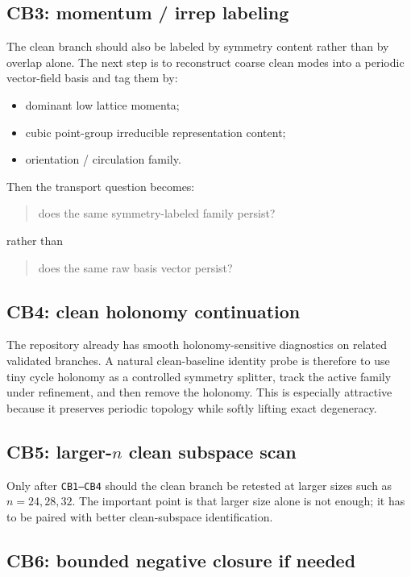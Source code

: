 \documentclass[11pt]{article}
\begin{document}
\subsection{CB3: momentum / irrep labeling}

The clean branch should also be labeled by symmetry content rather than by overlap alone. The next step is to reconstruct coarse clean modes into a periodic vector-field basis and tag them by:
\begin{itemize}
\item dominant low lattice momenta;
\item cubic point-group irreducible representation content;
\item orientation / circulation family.
\end{itemize}

Then the transport question becomes:
\begin{quote}
does the same symmetry-labeled family persist?
\end{quote}
rather than
\begin{quote}
does the same raw basis vector persist?
\end{quote}

\subsection{CB4: clean holonomy continuation}

The repository already has smooth holonomy-sensitive diagnostics on related validated branches. A natural clean-baseline identity probe is therefore to use tiny cycle holonomy as a controlled symmetry splitter, track the active family under refinement, and then remove the holonomy. This is especially attractive because it preserves periodic topology while softly lifting exact degeneracy.

\subsection{CB5: larger-\(n\) clean subspace scan}

Only after \texttt{CB1--CB4} should the clean branch be retested at larger sizes such as \(n = 24, 28, 32\). The important point is that larger size alone is not enough; it has to be paired with better clean-subspace identification.

\subsection{CB6: bounded negative closure if needed}
\end{document}
